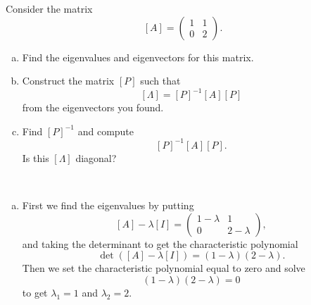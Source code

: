 \documentclass[12pt]{article} %
\begin{document}
\newpage
\begin{problem}
Consider the matrix
\[
[A] = \begin{pmatrix} 1 & 1 \\ 0 & 2 \end{pmatrix}.
\]
\begin{enumerate}[(a)]
    \item Find the eigenvalues and eigenvectors for this matrix.
    \item Construct the matrix $[P]$ such that
    \[
    [\Lambda] = [P]^{-1}[A][P]
    \]
    from the eigenvectors you found. 
    \item Find $[P]^{-1}$ and compute
    \[
    [P]^{-1}[A][P].
    \]
    Is this $[\Lambda]$ diagonal?
\end{enumerate} 
\end{problem}
\begin{solution}~
\begin{enumerate}[(a)]
    \item First we find the eigenvalues by putting
    \[
    [A]-\lambda [I] = \begin{pmatrix} 1 - \lambda & 1 \\ 0 & 2-\lambda \end{pmatrix},
    \]
    and taking the determinant to get the characteristic polynomial
    \[
    \det([A]-\lambda[I])=(1-\lambda)(2-\lambda).
    \]
    Then we set the characteristic polynomial equal to zero and solve
    \[
    (1-\lambda)(2-\lambda)=0
    \]
    to get $\lambda_1 = 1$ and $\lambda_2=2$.  
    

\end{enumerate}
\end{solution}
\end{document}
